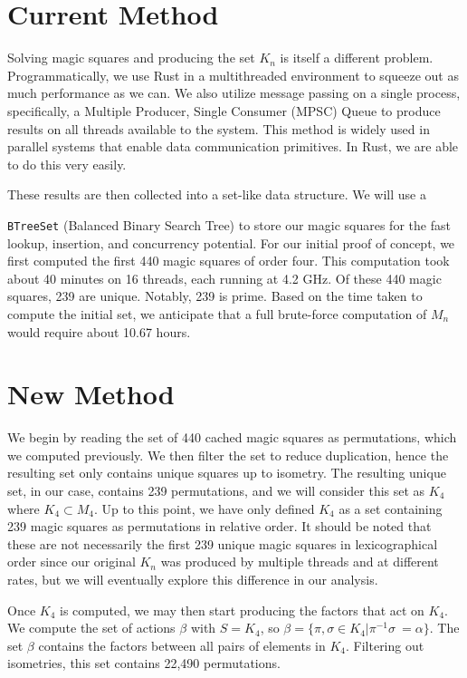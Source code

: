 \documentclass[12pt]{report}
\begin{document}
\section{Current Method}

\par Solving magic squares and producing the set $K_n$ is itself a different problem.
Programmatically, we use Rust in a multithreaded environment to squeeze out as much performance as
we can. We also utilize message passing on a single process, specifically, a Multiple Producer,
Single Consumer (MPSC) Queue to produce results on all threads available to the system. This method
is widely used in parallel systems that enable data communication primitives. In Rust, we are able
to do this very easily.

\par These results are then collected into a set-like data structure. We will use a

\texttt{BTreeSet} (Balanced Binary Search Tree) to store our magic squares for the fast lookup,
insertion, and concurrency potential. For our initial proof of concept, we first computed the first
440 magic squares of order four. This computation took about 40 minutes on 16 threads, each running
at 4.2 GHz. Of these 440 magic squares, 239 are unique. Notably, 239 is prime. Based on the time
taken to compute the initial set, we anticipate that a full brute-force computation of $M_n$ would
require about 10.67 hours.

\section{New Method}

\par We begin by reading the set of 440 cached magic squares as permutations, which we computed
previously. We then filter the set to reduce duplication, hence the resulting set only contains
unique squares up to isometry. The resulting unique set, in our case, contains 239 permutations,
and we will consider this set as $K_4$ where $K_4\subset M_4$. Up to this point, we have only
defined $K_4$ as a set containing 239 magic squares as permutations in relative order. It should be
noted that these are not necessarily the first 239 unique magic squares in lexicographical order
since our original $K_n$ was produced by multiple threads and at different rates, but we will
eventually explore this difference in our analysis.

\par Once $K_4$ is computed, we may then start producing the factors that act on $K_4$. We compute
the set of actions $\beta$ with $S = K_4$, so  $\beta = \{\pi,\sigma\in K_4| \pi^{-1}\sigma\ =
  \alpha\}$. The set $\beta$ contains the factors between all pairs of elements in $K_4$. Filtering
out isometries, this set contains 22,490 permutations.
\end{document}

